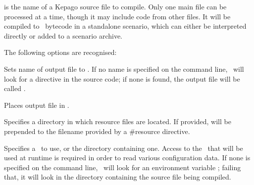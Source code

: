   \noindent{} is the name of a Kepago source file to compile.  Only
  one main file can be processed at a time, though it may include code from other
  files.  It will be compiled to \reallive\ bytecode in a standalone scenario, 
  which can either be interpreted directly or added to a scenario archive.

  The following options are recognised:

  \begin{nicelist}
  \item[\clbarg{o}{output}{FILE}]
    Sets name of output file to .  If no name is specified on the
    command line, \compiler\ will look for a  directive in the
    source code; if none is found, the output file will be called
    .
  \item[\clbarg{d}{outdir}{DIR}]
    Places output file in .
  \item[\clbarg{r}{resdir}{DIR}]
    Specifies a directory in which resource files are located.  If provided, 
	 will be prepended to the filename provided by a #resource 
	directive.
  \item[\clbarg{i}{ini}{FILE}]\label{usage:inifile}
    Specifies a \gameexe\ to use, or the directory containing one.  Access to 
    the \gameexe\ that will be used at runtime is required in order to read 
    various configuration data.  If none is specified on the command line, 
    \compiler\ will look for an environment variable ; failing 
    that, it will look in the directory containing the source file being 
    compiled.    
  \end{nicelist}

